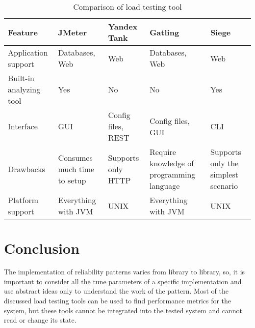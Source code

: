 \begin{longtable}[c]{|p{4cm}|p{2.5cm}|p{2.5cm}|p{2.5cm}|p{2.5cm}|}
    \caption{Comparison of load testing tool}
    \label{tab:load_tools} \\
    \hline
    \textbf{Feature}        & \textbf{JMeter}             & \textbf{Yandex Tank} & \textbf{Gatling}                          & \textbf{Siege}                      \\
    \endhead
    \hline
    Application support     & Databases, Web              & Web                  & Databases, Web                            & Web                                 \\
    \hline
    Built-in analyzing tool & Yes                         & No                   & No                                        & Yes                                 \\
    \hline
    Interface               & GUI                         & Config files, REST   & Config files, GUI                         & CLI                                 \\
    \hline
    Drawbacks               & Consumes much time to setup & Supports only HTTP   & Require knowledge of programming language               & Supports only the simplest scenario              \\
    \hline
    Platform support        & Everything with JVM         & UNIX                 & Everything with JVM                       & UNIX                                \\
    \hline
\end{longtable}


\section{Conclusion}\label{sec:review_conclusion}
The implementation of reliability patterns varies from library to library, so, it is important to consider all the tune parameters of a specific implementation and use abstract ideas only to understand the work of the pattern.
Most of the discussed load testing tools can be used to find performance metrics for the system, but these tools cannot be integrated into the tested system and cannot read or change its state.